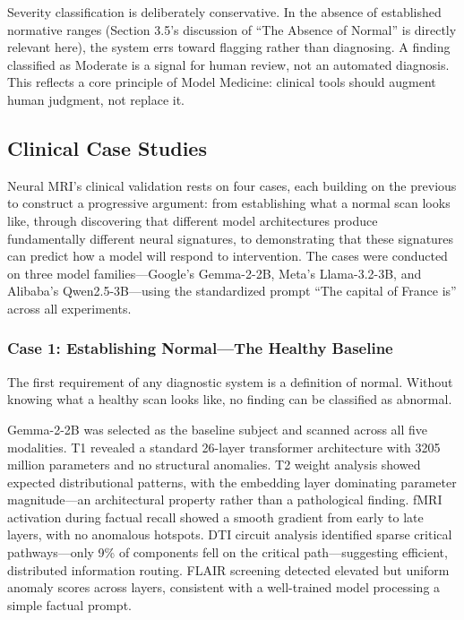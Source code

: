 \documentclass[11pt]{article}
\begin{document}
Severity classification is deliberately conservative. In the absence of established normative ranges (Section 3.5's discussion of ``The Absence of Normal'' is directly relevant here), the system errs toward flagging rather than diagnosing. A finding classified as Moderate is a signal for human review, not an automated diagnosis. This reflects a core principle of Model Medicine: clinical tools should augment human judgment, not replace it.

\subsection{Clinical Case Studies}

Neural MRI's clinical validation rests on four cases, each building on the previous to construct a progressive argument: from establishing what a normal scan looks like, through discovering that different model architectures produce fundamentally different neural signatures, to demonstrating that these signatures can predict how a model will respond to intervention. The cases were conducted on three model families---Google's Gemma-2-2B, Meta's Llama-3.2-3B, and Alibaba's Qwen2.5-3B---using the standardized prompt ``The capital of France is'' across all experiments.

\subsubsection{Case 1: Establishing Normal---The Healthy Baseline}

The first requirement of any diagnostic system is a definition of normal. Without knowing what a healthy scan looks like, no finding can be classified as abnormal.

Gemma-2-2B was selected as the baseline subject and scanned across all five modalities. T1 revealed a standard 26-layer transformer architecture with 3205 million parameters and no structural anomalies. T2 weight analysis showed expected distributional patterns, with the embedding layer dominating parameter magnitude---an architectural property rather than a pathological finding. fMRI activation during factual recall showed a smooth gradient from early to late layers, with no anomalous hotspots. DTI circuit analysis identified sparse critical pathways---only 9\% of components fell on the critical path---suggesting efficient, distributed information routing. FLAIR screening detected elevated but uniform anomaly scores across layers, consistent with a well-trained model processing a simple factual prompt.
\end{document}
